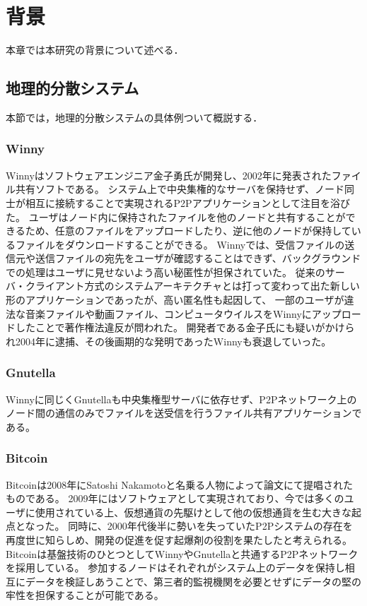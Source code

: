 \chapter{背景}
\label{background}

本章では本研究の背景について述べる．

\section{地理的分散システム}
本節では，地理的分散システムの具体例ついて概説する．

\subsection{Winny}
Winnyはソフトウェアエンジニア金子勇氏が開発し、2002年に発表されたファイル共有ソフトである。
システム上で中央集権的なサーバを保持せず、ノード同士が相互に接続することで実現されるP2Pアプリケーションとして注目を浴びた。
ユーザはノード内に保持されたファイルを他のノードと共有することができるため、任意のファイルをアップロードしたり、逆に他のノードが保持しているファイルをダウンロードすることができる。
Winnyでは、受信ファイルの送信元や送信ファイルの宛先をユーザが確認することはできず、バックグラウンドでの処理はユーザに見せないよう高い秘匿性が担保されていた。
従来のサーバ・クライアント方式のシステムアーキテクチャとは打って変わって出た新しい形のアプリケーションであったが、高い匿名性も起因して、
一部のユーザが違法な音楽ファイルや動画ファイル、コンピュータウイルスをWinnyにアップロードしたことで著作権法違反が問われた。
開発者である金子氏にも疑いがかけられ2004年に逮捕、その後画期的な発明であったWinnyも衰退していった。

\subsection{Gnutella}
Winnyに同じくGnutellaも中央集権型サーバに依存せず、P2Pネットワーク上のノード間の通信のみでファイルを送受信を行うファイル共有アプリケーションである。

\subsection{Bitcoin}
Bitcoinは2008年にSatoshi Nakamotoと名乗る人物によって論文にて提唱されたものである。
2009年にはソフトウェアとして実現されており、今では多くのユーザに使用されている上、仮想通貨の先駆けとして他の仮想通貨を生む大きな起点となった。
同時に、2000年代後半に勢いを失っていたP2Pシステムの存在を再度世に知らしめ、開発の促進を促す起爆剤の役割を果たしたと考えられる。
Bitcoinは基盤技術のひとつとしてWinnyやGnutellaと共通するP2Pネットワークを採用している。
参加するノードはそれぞれがシステム上のデータを保持し相互にデータを検証しあうことで、第三者的監視機関を必要とせずにデータの堅の牢性を担保することが可能である。

